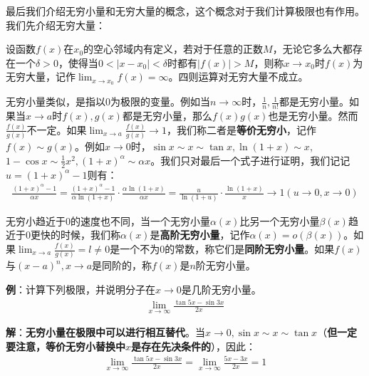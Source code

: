 \documentclass{ctexart}
\let\oldtextbf\textbf %
\renewcommand{\textbf}[1]{\textcolor{btex}{\oldtextbf{#1}}} %
\begin{document}
最后我们介绍无穷小量和无穷大量的概念，这个概念对于我们计算极限也有作用。我们先介绍无穷大量：
\begin{tcolorbox}[
    colback=bac2,     %
    colframe=fra2,   %
    coltitle=white,             %
    coltext=tex2,
    title=无穷大量,
    fonttitle=\bfseries,        %
arc=3mm,                     %
breakable
]
设函数$f(x)$在$x_0$的空心邻域内有定义，若对于任意的正数$M$，无论它多么大都存在一个$\delta>0$，使得当$0<|x-x_0|<\delta$时都有$|f(x)|>M$，则称$x\to x_0$时$f(x)$为无穷大量，记作$\lim_{x\to x_0}f(x)=\infty$。四则运算对无穷大量不成立。
\end{tcolorbox}

无穷小量类似，是指以0为极限的变量。例如当$n\to\infty$时，$\frac{1}{n},\frac{1}{n!}$都是无穷小量。如果当$x\to a$时$f(x),g(x)$都是无穷小量，那么$f(x)g(x)$也是无穷小量。然而$\frac{f(x)}{g(x)}$不一定。如果$\lim_{x\to a}\frac{f(x)}{g(x)}\to 1$，我们称二者是\textbf{\color{btex}等价无穷小}，记作$f(x)\sim g(x)$。例如$x\to 0$时，$\sin x\sim x\sim \tan x,\ln(1+x)\sim x$,$1-\cos x\sim \frac{1}{2}x^2,(1+x)^\alpha\sim \alpha x$。我们只对最后一个式子进行证明，我们记记$u=(1+x)^\alpha-1$则有：
\begin{align*}
    \frac{(1+x)^\alpha-1}{\alpha x}=\frac{(1+x)^\alpha-1}{\alpha \ln(1+x)}\cdot\frac{\alpha\ln(1+x)}{\alpha x}=\frac{u}{\ln(1+u)}\cdot\frac{\ln(1+x)}{x}\to 1 ({u\to 0,x\to 0})
\end{align*}

无穷小趋近于0的速度也不同，当一个无穷小量$\alpha(x)$比另一个无穷小量$\beta(x)$趋近于0更快的时候，我们称$\alpha(x)$是\textbf{\color{btex}高阶无穷小量}，记作$\alpha(x)=o(\beta(x))$。如果$\lim_{x\to a}\frac{f(x)}{g(x)}=l\neq 0$是一个不为0的常数，称它们是\textbf{\color{btex}同阶无穷小量}。如果$f(x)$与$(x-a)^n,x\to a$是同阶的，称$f(x)$是$n$阶无穷小量。

\textbf{\color{btex}例}：计算下列极限，并说明分子在$x\to 0$是几阶无穷小量。
\begin{align*}
    \lim_{x\to\infty}\frac{\tan 5x-\sin 3x}{2x}
\end{align*}

\textbf{\color{btex}解}：\textbf{\color{btex}无穷小量在极限中可以进行相互替代}。当$x\to 0,\sin x\sim x\sim \tan x$（\textbf{但一定要注意，等价无穷小替换中$x$是存在先决条件的}），因此：
\begin{align*}
    \lim_{x\to\infty}\frac{\tan 5x-\sin 3x}{2x}=\lim_{x\to\infty}\frac{5x-3x}{2x}=1
\end{align*}
\end{document}
